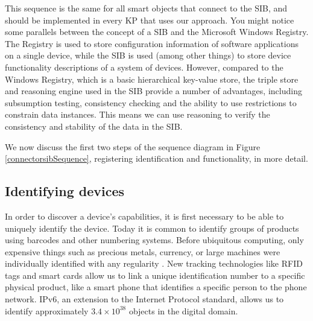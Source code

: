  This sequence is the same for all smart objects that connect to the \ac{SIB}, and should be implemented in every \ac{KP} that uses our approach. You might notice some parallels between the concept of a \ac{SIB} and the Microsoft Windows Registry. The Registry is used to store configuration information of software applications on a single device, while the \ac{SIB} is used (among other things) to store device functionality descriptions of a system of devices. However, compared to the Windows Registry, which is a basic hierarchical key-value store, the triple store and reasoning engine used in the \ac{SIB} provide a number of advantages, including subsumption testing, consistency checking and the ability to use restrictions to constrain data instances. This means we can use reasoning to verify the consistency and stability of the data in the \ac{SIB}.

We now discuss the first two steps of the sequence diagram in Figure \ref{connectorsibSequence}, registering identification and functionality, in more detail.

\subsection{Identifying devices}

In order to discover a device's capabilities, it is first necessary to be able to uniquely identify the device. Today it is common to identify groups of products using barcodes and other numbering systems. Before ubiquitous computing, only expensive things such as precious metals, currency, or large machines were individually identified with any regularity \cite{Kuniavsky}. New tracking technologies like \ac{RFID} tags and smart cards allow us to link a unique identification number to a specific physical product, like a smart phone that identifies a specific person to the phone network. IPv6, an extension to the Internet Protocol standard, allows us to identify approximately $3.4 \times 10^{38} $ objects in the digital domain.


